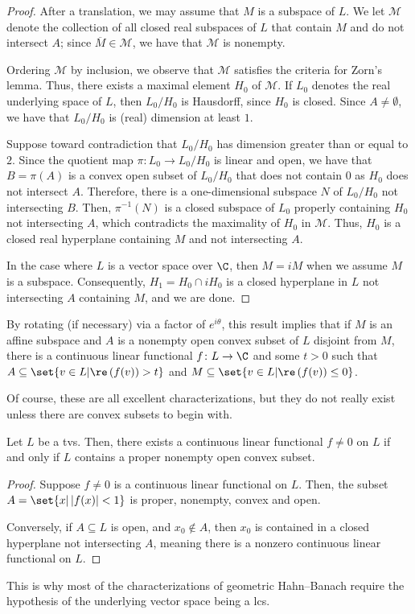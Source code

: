 \documentclass[10pt]{mypackage}
\begin{document}
\begin{proof}
  After a translation, we may assume that $M$ is a subspace of $L$. We let $\mathcal{M}$ denote the collection of all closed real subspaces of $L$ that contain $M$ and do not intersect $A$; since $ \overline{M}\in \mathcal{M} $, we have that $\mathcal{M}$ is nonempty.

  Ordering $\mathcal{M}$ by inclusion, we observe that $\mathcal{M}$ satisfies the criteria for Zorn's lemma. Thus, there exists a maximal element $H_0$ of $\mathcal{M}$. If $L_0$ denotes the real underlying space of $L$, then $L_0/H_0$ is Hausdorff, since $H_0$ is closed. Since $A\neq\emptyset$, we have that $L_0/H_0$ is (real) dimension at least $1$.

  Suppose toward contradiction that $L_0/H_0$ has dimension greater than or equal to $2$. Since the quotient map $\pi\colon L_0\rightarrow L_0/H_0$ is linear and open, we have that $B = \pi(A)$ is a convex open subset of $L_0/H_0$ that does not contain $0$ as $H_0$ does not intersect $A$. Therefore, there is a one-dimensional subspace $N$ of $L_0/H_0$ not intersecting $B$. Then, $\pi^{-1}\left( N \right)$ is a closed subspace of $L_0$ properly containing $H_0$ not intersecting $A$, which contradicts the maximality of $H_0$ in $\mathcal{M}$. Thus, $H_0$ is a closed real hyperplane containing $M$ and not intersecting $A$.

  In the case where $L$ is a vector space over $\C$, then $M = iM$ when we assume $M$ is a subspace. Consequently, $H_1 = H_0\cap iH_0$ is a closed hyperplane in $L$ not intersecting $A$ containing $M$, and we are done.
\end{proof}
By rotating (if necessary) via a factor of $e^{i\theta}$, this result implies that if $M$ is an affine subspace and $A$ is a nonempty open convex subset of $L$ disjoint from $M$, there is a continuous linear functional $f\colon L\rightarrow \C$ and some $t > 0$ such that $A\subseteq \set{v\in L | \re\left( f(v) \right) > t}$ and $M\subseteq \set{v\in L | \re\left( f(v) \right) \leq 0}$.

Of course, these are all excellent characterizations, but they do not really exist unless there are convex subsets to begin with.
\begin{corollary}
  Let $L$ be a tvs. Then, there exists a continuous linear functional $f\neq 0$ on $L$ if and only if $L$ contains a proper nonempty open convex subset.
\end{corollary}
\begin{proof}
  Suppose $f\neq 0$ is a continuous linear functional on $L$. Then, the subset $A = \set{x | \left\vert f(x) \right\vert < 1}$ is proper, nonempty, convex and open.

  Conversely, if $A\subseteq L$ is open, and $x_0\notin A$, then $x_0$ is contained in a closed hyperplane not intersecting $A$, meaning there is a nonzero continuous linear functional on $L$.
\end{proof}
This is why most of the characterizations of geometric Hahn--Banach require the hypothesis of the underlying vector space being a lcs.
\end{document}
